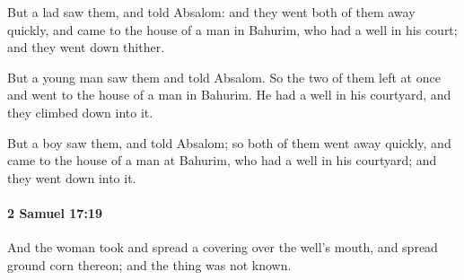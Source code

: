 			\begin{versebox}
					\item[BHS] 
					\item[ASV] But a lad saw them, and told Absalom: and they went both of them away quickly, and came to the house of a man in Bahurim, who had a well in his court; and they went down thither.
					\item[NIV] But a young man saw them and told Absalom. So the two of them left at once and went to the house of a man in Bahurim. He had a well in his courtyard, and they climbed down into it.
					\item[NRSV] But a boy saw them, and told Absalom; so both of them went away quickly, and came to the house of a man at Bahurim, who had a well in his courtyard; and they went down into it.
			\end{versebox}

		\paragraph{2 Samuel 17:19} %
			\label{2SAMUEL-17-19}

			And the woman took and spread a covering over the well’s mouth, and spread ground corn thereon; and the thing was not known.

